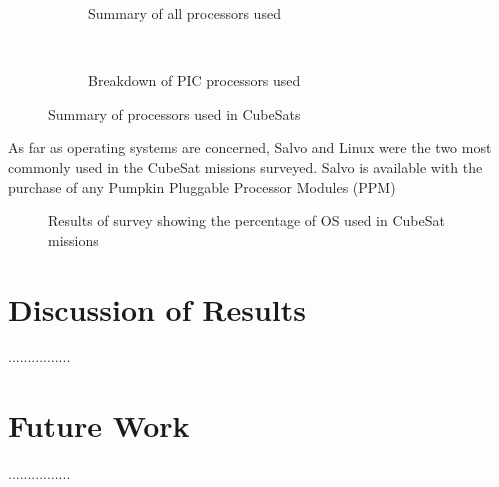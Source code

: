 \documentclass[11pt]{article}
\begin{document}
\begin{figure}[t!]
    \centering
    \begin{subfigure}[t]{0.5\textwidth}
        \centering
        \caption{Summary of all processors used}
    \end{subfigure}%
    ~ 
    \begin{subfigure}[t]{0.5\textwidth}
        \centering
        \caption{Breakdown of PIC processors used}
    \end{subfigure}
    \caption{Summary of processors used in CubeSats}
		\label{processors}
\end{figure}

As far as operating systems are concerned, Salvo and Linux were the two most commonly used in the CubeSat missions surveyed.  Salvo is available with the purchase of any Pumpkin Pluggable Processor Modules (PPM) 


\begin{figure}[ht!]
\centering
{}
\caption{Results of survey showing the percentage of OS used in CubeSat missions}
\label{OS}
\end{figure}

\section{Discussion of Results}
................
\section{Future Work}
................



\end{document}
